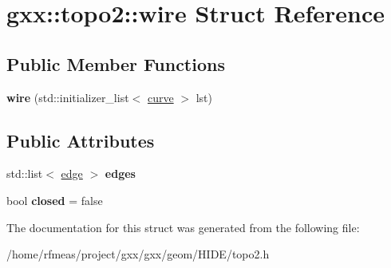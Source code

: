 \hypertarget{structgxx_1_1topo2_1_1wire}{}\section{gxx\+:\+:topo2\+:\+:wire Struct Reference}
\label{structgxx_1_1topo2_1_1wire}
\subsection*{Public Member Functions}
\begin{DoxyCompactItemize}
\item 
{\bfseries wire} (std\+::initializer\+\_\+list$<$ \hyperlink{classgxx_1_1topo2_1_1curve}{curve} $>$ lst)\hypertarget{structgxx_1_1topo2_1_1wire_ae162af72da744f31a2068ebda1cb2bed}{}\label{structgxx_1_1topo2_1_1wire_ae162af72da744f31a2068ebda1cb2bed}

\end{DoxyCompactItemize}
\subsection*{Public Attributes}
\begin{DoxyCompactItemize}
\item 
std\+::list$<$ \hyperlink{structgxx_1_1topo2_1_1edge}{edge} $>$ {\bfseries edges}\hypertarget{structgxx_1_1topo2_1_1wire_ad66f854877d973d647df8b0c77c0b746}{}\label{structgxx_1_1topo2_1_1wire_ad66f854877d973d647df8b0c77c0b746}

\item 
bool {\bfseries closed} = false\hypertarget{structgxx_1_1topo2_1_1wire_a0ecf8ccc32940c0040dfc35db8968b84}{}\label{structgxx_1_1topo2_1_1wire_a0ecf8ccc32940c0040dfc35db8968b84}

\end{DoxyCompactItemize}


The documentation for this struct was generated from the following file\+:\begin{DoxyCompactItemize}
\item 
/home/rfmeas/project/gxx/gxx/geom/\+H\+I\+D\+E/topo2.\+h\end{DoxyCompactItemize}
